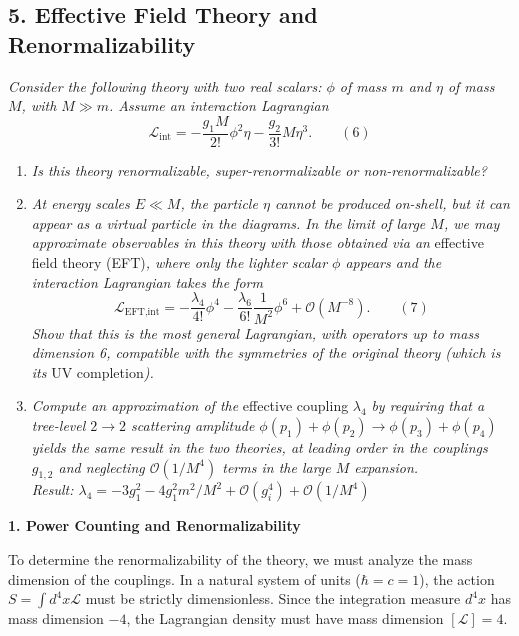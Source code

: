 \subsection*{5. Effective Field Theory and Renormalizability}

\begin{center}
    \textit{Consider the following theory with two real scalars: $\phi$ of mass $m$ and $\eta$ of mass $M$, with $M \gg m$. Assume an interaction Lagrangian}
    \[
        \mathcal{L}_{\text{int}} = -\frac{g_1 M}{2!} \phi^2 \eta - \frac{g_2}{3!} M \eta^3. \qquad (6)
    \]
    \begin{enumerate}
        \item \textit{Is this theory renormalizable, super-renormalizable or non-renormalizable?}
        \item \textit{At energy scales $E \ll M$, the particle $\eta$ cannot be produced on-shell, but it can appear as a virtual particle in the diagrams. In the limit of large $M$, we may approximate observables in this theory with those obtained via an } effective field theory (EFT)\textit{, where only the lighter scalar $\phi$ appears and the interaction Lagrangian takes the form}
              \[
                  \mathcal{L}_{\text{EFT,int}} = -\frac{\lambda_4}{4!} \phi^4 - \frac{\lambda_6}{6!} \frac{1}{M^2} \phi^6 + \mathcal{O}(M^{-8}). \qquad (7)
              \]
              \textit{Show that this is the most general Lagrangian, with operators up to mass dimension 6, compatible with the symmetries of the original theory (which is its } UV completion\textit{).}
        \item \textit{Compute an approximation of the } effective coupling $\lambda_4$ \textit{ by requiring that a tree-level $2 \to 2$ scattering amplitude $\phi(p_1) + \phi(p_2) \to \phi(p_3) + \phi(p_4)$ yields the same result in the two theories, at leading order in the couplings $g_{1,2}$ and neglecting $\mathcal{O}(1/M^4)$ terms in the large $M$ expansion. \\
                  Result: $\lambda_4 = -3g_1^2 - 4g_1^2 m^2/M^2 + \mathcal{O}(g_i^4) + \mathcal{O}(1/M^4)$}
    \end{enumerate}
\end{center}

\textbf{1. Power Counting and Renormalizability}

To determine the renormalizability of the theory, we must analyze the mass dimension of the couplings. In a natural system of units ($\hbar = c = 1$), the action $S = \int d^4x \mathcal{L}$ must be strictly dimensionless. Since the integration measure $d^4x$ has mass dimension $-4$, the Lagrangian density must have mass dimension $[\mathcal{L}] = 4$.


